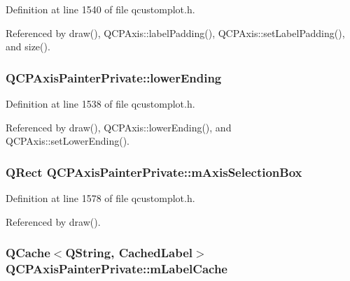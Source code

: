 Definition at line 1540 of file qcustomplot.\+h.



Referenced by draw(), Q\+C\+P\+Axis\+::label\+Padding(), Q\+C\+P\+Axis\+::set\+Label\+Padding(), and size().

\hypertarget{class_q_c_p_axis_painter_private_a077696dd1e7efb96e4c199f521433e24}{}
\subsubsection[{lower\+Ending}]{ Q\+C\+P\+Axis\+Painter\+Private\+::lower\+Ending}\label{class_q_c_p_axis_painter_private_a077696dd1e7efb96e4c199f521433e24}


Definition at line 1538 of file qcustomplot.\+h.



Referenced by draw(), Q\+C\+P\+Axis\+::lower\+Ending(), and Q\+C\+P\+Axis\+::set\+Lower\+Ending().

\hypertarget{class_q_c_p_axis_painter_private_a9d7586f4923994488bdd006415b13f5f}{}
\subsubsection[{m\+Axis\+Selection\+Box}]{\setlength{\rightskip}{0pt plus 5cm}Q\+Rect Q\+C\+P\+Axis\+Painter\+Private\+::m\+Axis\+Selection\+Box\hspace{0.3cm}{\ttfamily [protected]}}\label{class_q_c_p_axis_painter_private_a9d7586f4923994488bdd006415b13f5f}


Definition at line 1578 of file qcustomplot.\+h.



Referenced by draw().

\hypertarget{class_q_c_p_axis_painter_private_a07ac270ea0c0ae084debd48d6a740e35}{}
\subsubsection[{m\+Label\+Cache}]{\setlength{\rightskip}{0pt plus 5cm}Q\+Cache$<$Q\+String, {\bf Cached\+Label}$>$ Q\+C\+P\+Axis\+Painter\+Private\+::m\+Label\+Cache\hspace{0.3cm}{\ttfamily [protected]}}\label{class_q_c_p_axis_painter_private_a07ac270ea0c0ae084debd48d6a740e35}


